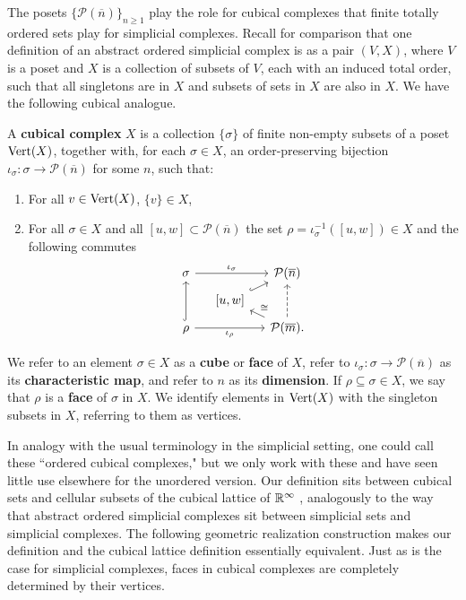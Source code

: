 The posets $\{\mathcal P(\overline n)\}_{n \geq 1}$ play the role for cubical complexes that finite totally ordered sets play for simplicial complexes.
Recall for comparison that one definition of an abstract ordered simplicial complex is as a pair $(V, X)$, where $V$ is a poset and $X$ is a collection of subsets of $V$, each with an induced total order, such that all singletons are in $X$ and subsets of sets in $X$ are also in $X$.
We have the following cubical analogue.

\begin{definition}\label{D:cubical}
	A \textbf{cubical complex} $X$ is a collection $\{ \sigma \}$ of finite non-empty subsets of a poset
	${\rm Vert}(X)$, together with, for each $\sigma \in X$, an order-preserving bijection $\iota_\sigma \colon \sigma \to \mathcal P(\overline n)$ for some $n$, such that:
	\begin{enumerate}
		\item For all $v \in {\rm Vert}(X)$, $\{v\} \in X$,
		\item For all $\sigma \in X$ and all $[u,w] \subset \mathcal P(\overline n)$ the set $\rho = \iota_\sigma^{-1}([u,w]) \in X$ and the following commutes
		\begin{equation*}
		\begin{tikzcd} [row sep = tiny, column sep= small]
		\sigma \arrow[rr, "\iota_\sigma"] && \mathcal P(\overline n) \\
		& [-5pt] {[}u,w{]} \arrow[ur, hook] & \\
		\rho \arrow[uu, hook] \arrow[rr, "\iota_\rho"'] && \mathcal P(\overline m). \arrow[ul, "\cong"'] \arrow[uu, dashed]
		\end{tikzcd}
		\end{equation*}
	\end{enumerate}
	We refer to an element $\sigma \in X$ as a \textbf{cube} or \textbf{face} of $X$, refer to $\iota_\sigma \colon \sigma \to \mathcal P(\overline{n})$ as its \textbf{characteristic map},
	and refer to $n$ as its \textbf{dimension}. If $\rho \subseteq \sigma \in X$, we say that $\rho$ is a \textbf{face} of $\sigma$ in $X$.
	We identify elements in ${\rm Vert}(X)$ with the singleton subsets in $X$, referring to them as vertices.
\end{definition}





In analogy with the usual terminology in the simplicial setting, one could call these ``ordered cubical complexes," but we only work with these and have seen little use elsewhere for the unordered version.
Our definition sits between cubical sets \cite{jardine2002cubical} and cellular subsets of the cubical lattice of $\mathbb{R}^\infty$ \cite{kaczynski2006computational}, analogously to the way that abstract ordered simplicial complexes sit between simplicial sets and simplicial complexes.
The following geometric realization construction makes our definition and the cubical lattice definition essentially equivalent. Just as is the case for simplicial complexes, faces in cubical complexes are completely determined by their vertices.


